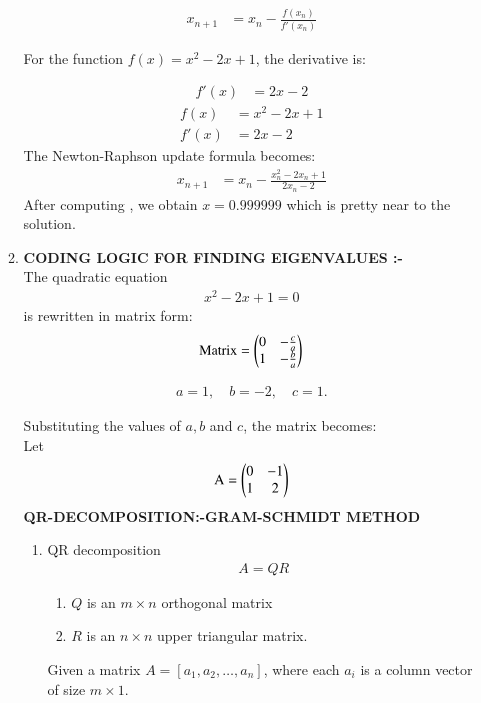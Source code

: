 \documentclass[journal]{IEEEtran}
\begin{document}
\begin{enumerate}
\begin{enumerate}
					\begin{align}
						x_{n+1} &= x_n - \frac{f(x_n)}{f'(x_n)}
					\end{align}

				For the function \( f(x) = x^2 - 2x + 1 \), the derivative is:

					\begin{align}
						f'(x) &= 2x - 2
					\end{align}
					\begin{align}
						f(x) &= x^2 - 2x + 1 \\
						f'(x) &= 2x - 2
					\end{align}
				The Newton-Raphson update formula becomes:
					\begin{align}
						x_{n+1} &= x_n - \frac{x_n^2 - 2x_n + 1}{2x_n - 2}
					\end{align}
				After computing , we obtain $x = 0.999999$ which is pretty near to the solution. \\ 
			\item \textbf{CODING LOGIC FOR FINDING EIGENVALUES :-}\\


The quadratic equation 
\begin{align}
x^2 - 2x + 1 = 0
\end{align}
is rewritten in matrix form:
\begin{align}
\text{Matrix} =
\begin{pmatrix}0 & -\frac{c}{a} \\
1 & -\frac{b}{a}
\end{pmatrix}
\end{align}

\begin{align}
a = 1, \quad b = -2, \quad c = 1.
\end{align}

Substituting the values of $a,b$ and $c$, the matrix becomes:\\
Let
\begin{align}
\text{A} =
\begin{pmatrix}0 & -1 \\
1 & 2
\end{pmatrix}
\end{align}
\textbf{QR-DECOMPOSITION:-GRAM-SCHMIDT METHOD}\\



\begin{enumerate}

\item QR decomposition 
\begin{align}
A = QR
\end{align}
\begin{enumerate}
    \item $Q$ is an $ m \times n $ orthogonal matrix
    \item $R$ is an $n \times n$ upper triangular matrix.
\end{enumerate}
Given a matrix $ A = [a_1, a_2, \dots, a_n] $, where each $ a_i $ is a column vector of size $ m \times 1 $.


\end{enumerate}
\end{enumerate}
\end{enumerate}
\end{document}
